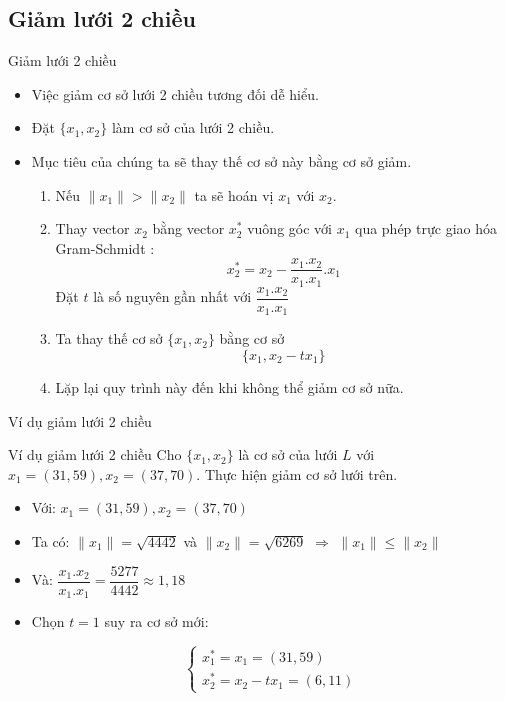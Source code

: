 \documentclass{beamer}
\numberwithin{equation}{section}
\begin{document}
\subsection{Giảm lưới 2 chiều}
\begin{frame}{Giảm lưới 2 chiều}
\begin{itemize}
\item Việc giảm cơ sở lưới 2 chiều tương đối dễ hiểu.
\item Đặt $\{x_1, x_2\}$ làm cơ sở của lưới 2 chiều.
\item Mục tiêu của chúng ta sẽ thay thế cơ sở này bằng cơ sở giảm.
\begin{enumerate}
\item Nếu $\|x_1\| > \|x_2\|$ ta sẽ hoán vị $x_1$ với $x_2$.
\item Thay vector $x_2$ bằng vector $x_2^*$ vuông góc với $x_1$ qua phép trực giao hóa Gram-Schmidt :
$$x_2^* = x_2 - \frac{x_1.x_2}{x_1.x_1}.x_1 $$ Đặt $t$ là số nguyên gần nhất với $\dfrac{x_1.x_2}{x_1.x_1}$
\item Ta thay thế cơ sở $\{x_1, x_2 \}$ bằng cơ sở $$\{x_1, x_2 - tx_1\}$$
\item Lặp lại quy trình này đến khi không thể giảm cơ sở nữa.
\end{enumerate}
\end{itemize}
\end{frame}
\begin{frame}{Ví dụ giảm lưới 2 chiều}

\begin{block}{Ví dụ giảm lưới 2 chiều}
Cho $\{x_1, x_2\}$ là cơ sở của lưới $L$ với $x_1 = (31, 59), x_2 = (37, 70)$. Thực hiện giảm cơ sở lưới trên.
\end{block}

\begin{itemize}
\item Với: $x_1 = (31, 59), x_2 = (37, 70)$
\item Ta có: $\|x_1\|= \sqrt{4442}$ và $\|x_2\| = \sqrt{6269}$ $\Rightarrow$ $\|x_1\| \leq \|x_2\|$
\item Và: $\dfrac{x_1.x_2}{x_1.x_1} = \dfrac{5277}{4442} \approx 1, 18$
\item Chọn $t = 1 $ suy ra cơ sở mới:

$$\begin{cases}
x_1^{*} = x_1 = (31, 59)\\
x_2^{*} = x_2 - t x_1 = (6, 11)
\end{cases}$$
\end{itemize}

\end{frame}
\end{document}
